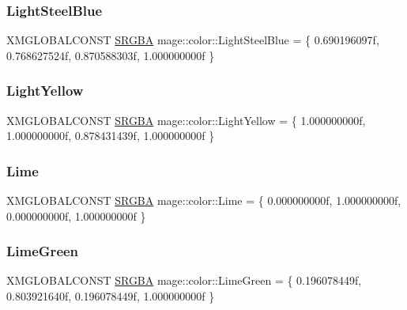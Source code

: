 \subsubsection{\texorpdfstring{Light\+Steel\+Blue}{LightSteelBlue}}
{\footnotesize\ttfamily X\+M\+G\+L\+O\+B\+A\+L\+C\+O\+N\+ST \hyperlink{structmage_1_1_s_r_g_b_a}{S\+R\+G\+BA} mage\+::color\+::\+Light\+Steel\+Blue = \{ 0.\+690196097f, 0.\+768627524f, 0.\+870588303f, 1.\+000000000f \}}

\hypertarget{namespacemage_1_1color_ae61f91b745e7c402c59183f41419f6f5}{}\label{namespacemage_1_1color_ae61f91b745e7c402c59183f41419f6f5} 
\subsubsection{\texorpdfstring{Light\+Yellow}{LightYellow}}
{\footnotesize\ttfamily X\+M\+G\+L\+O\+B\+A\+L\+C\+O\+N\+ST \hyperlink{structmage_1_1_s_r_g_b_a}{S\+R\+G\+BA} mage\+::color\+::\+Light\+Yellow = \{ 1.\+000000000f, 1.\+000000000f, 0.\+878431439f, 1.\+000000000f \}}

\hypertarget{namespacemage_1_1color_a90fd3c1444eed6c785c1b7c05c73be72}{}\label{namespacemage_1_1color_a90fd3c1444eed6c785c1b7c05c73be72} 
\subsubsection{\texorpdfstring{Lime}{Lime}}
{\footnotesize\ttfamily X\+M\+G\+L\+O\+B\+A\+L\+C\+O\+N\+ST \hyperlink{structmage_1_1_s_r_g_b_a}{S\+R\+G\+BA} mage\+::color\+::\+Lime = \{ 0.\+000000000f, 1.\+000000000f, 0.\+000000000f, 1.\+000000000f \}}

\hypertarget{namespacemage_1_1color_a5195a79b9fdc7dd1830497ef2216c678}{}\label{namespacemage_1_1color_a5195a79b9fdc7dd1830497ef2216c678} 
\subsubsection{\texorpdfstring{Lime\+Green}{LimeGreen}}
{\footnotesize\ttfamily X\+M\+G\+L\+O\+B\+A\+L\+C\+O\+N\+ST \hyperlink{structmage_1_1_s_r_g_b_a}{S\+R\+G\+BA} mage\+::color\+::\+Lime\+Green = \{ 0.\+196078449f, 0.\+803921640f, 0.\+196078449f, 1.\+000000000f \}}

